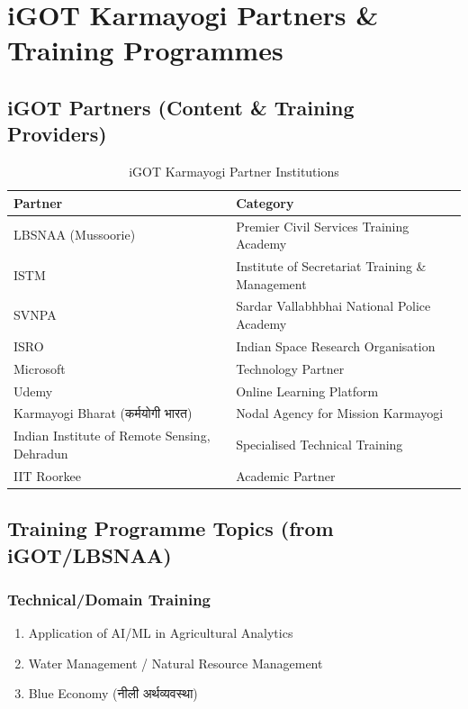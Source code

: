 \documentclass[12pt,a4paper]{article}
\newcommand{\hindi}[1]{{\hindifont #1}}
\begin{document}
\section{iGOT Karmayogi Partners \& Training Programmes}

\subsection{iGOT Partners (Content \& Training Providers)}

\begin{table}[h!]
\centering
\caption{iGOT Karmayogi Partner Institutions}
\begin{tabularx}{\textwidth}{@{}lX@{}}
\toprule
\textbf{Partner} & \textbf{Category} \\
\midrule
LBSNAA (Mussoorie) & Premier Civil Services Training Academy \\
ISTM & Institute of Secretariat Training \& Management \\
SVNPA & Sardar Vallabhbhai National Police Academy \\
ISRO & Indian Space Research Organisation \\
Microsoft & Technology Partner \\
Udemy & Online Learning Platform \\
Karmayogi Bharat (\hindi{कर्मयोगी भारत}) & Nodal Agency for Mission Karmayogi \\
Indian Institute of Remote Sensing, Dehradun & Specialised Technical Training \\
IIT Roorkee & Academic Partner \\
\bottomrule
\end{tabularx}
\end{table}

\subsection{Training Programme Topics (from iGOT/LBSNAA)}

\subsubsection{Technical/Domain Training}
\begin{enumerate}
  \item Application of AI/ML in Agricultural Analytics
  \item Water Management / Natural Resource Management
  \item Blue Economy (\hindi{नीली अर्थव्यवस्था})
\end{enumerate}
\end{document}
